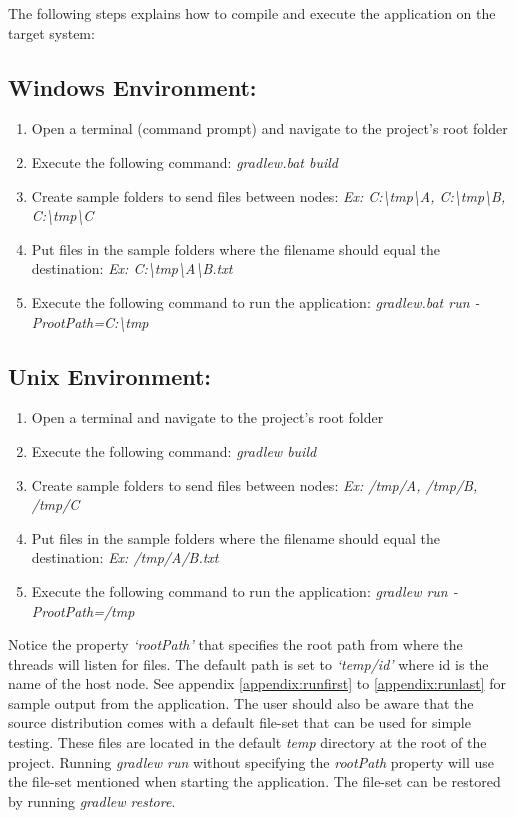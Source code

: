 \documentclass{scrartcl}
\begin{document}
The following steps explains how to compile and execute the application on the target system:

\subsection{Windows Environment:}
\begin{enumerate}
\item Open a terminal (command prompt) and navigate to the project's root folder
\item Execute the following command: \emph{gradlew.bat build}
\item Create sample folders to send files between nodes: \emph{Ex: {C:\textbackslash tmp\textbackslash A}, {C:\textbackslash tmp\textbackslash B}, {C:\textbackslash tmp\textbackslash C}}
\item Put files in the sample folders where the filename should equal the destination: \emph{Ex: {C:\textbackslash tmp\textbackslash A\textbackslash B.txt}}
\item Execute the following command to run the application: \emph{gradlew.bat run -ProotPath=C:\textbackslash tmp}
\end{enumerate}

\subsection{Unix Environment:}
\begin{enumerate}
\item Open a terminal and navigate to the project's root folder
\item Execute the following command: \emph{gradlew build}
\item Create sample folders to send files between nodes: \emph{Ex: /tmp/A, /tmp/B, /tmp/C}
\item Put files in the sample folders where the filename should equal the destination: \emph{Ex: /tmp/A/B.txt}
\item Execute the following command to run the application: \emph{gradlew run -ProotPath=/tmp}
\end{enumerate}

Notice the property \textit{‘rootPath’} that specifies the root path from where the threads will listen for files. The default path is set to \textit{‘temp/id’} where id is the name of the host node. See appendix \ref{appendix:runfirst} to \ref{appendix:runlast} for sample output from the application. The user should also be aware that the source distribution comes with a default file-set that can be used for simple testing. These files are located in the default \textit{temp} directory at the root of the project. Running \emph{gradlew run} without specifying the \textit{rootPath} property will use the file-set mentioned when starting the application. The file-set can be restored by running \emph{gradlew restore}.
\end{document}
